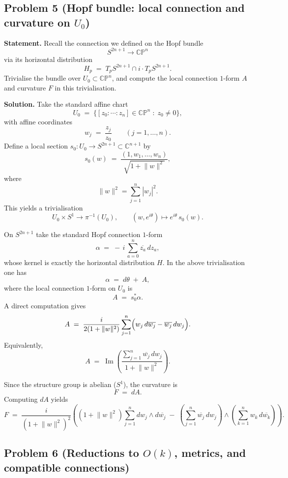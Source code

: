\documentclass[12pt,a4paper]{article}
\theoremstyle{plain}
\theoremstyle{definition}      %
\begin{document}
\subsection*{Problem 5 (Hopf bundle: local connection and curvature on $U_0$)}

\textbf{Statement.}
Recall the connection we defined on the Hopf bundle
\[
S^{2n+1}\longrightarrow \mathbb{CP}^n
\]
via its horizontal distribution
\[
H_p \;=\; T_pS^{2n+1}\cap i\cdot T_pS^{2n+1}.
\]
Trivialise the bundle over $U_0\subset \mathbb{CP}^n$, and compute the local connection $1$-form $A$ and curvature $F$ in this trivialisation.

\textbf{Solution.}
Take the standard affine chart
\[
U_0 \;=\;\{[z_0:\cdots:z_n]\in \mathbb{CP}^n \;:\; z_0\neq 0\},
\]
with affine coordinates
\[
w_j \;=\;\frac{z_j}{z_0}\qquad (j=1,\dots,n).
\]
Define a local section $s_0:U_0\to S^{2n+1}\subset \mathbb{C}^{n+1}$ by
\[
s_0(w)\;=\;\frac{(1,w_1,\dots,w_n)}{\sqrt{1+\lVert w\rVert^2}},
\]
where
\[
\lVert w\rVert^2=\sum_{j=1}^n |w_j|^2.
\]
This yields a trivialisation
\[
U_0\times S^1 \longrightarrow \pi^{-1}(U_0),
\qquad
(w,e^{i\theta})\longmapsto e^{i\theta}\,s_0(w).
\]

On $S^{2n+1}$ take the standard Hopf connection $1$-form
\[
\alpha \;=\; -\,i\,\sum_{a=0}^n \overline{z_a}\,dz_a,
\]
whose kernel is exactly the horizontal distribution $H$.
In the above trivialisation one has
\[
\alpha \;=\; d\theta \;+\; A,
\]
where the local connection $1$-form on $U_0$ is
\[
A \;=\; s_0^{*}\alpha.
\]
A direct computation gives
\[
A \;=\; \frac{i}{2(1+\lVert w\rVert^2)}\sum_{j=1}^n\Bigl(w_j\,d\overline{w_j}-\overline{w_j}\,dw_j\Bigr).
\]
Equivalently,
\[
A \;=\; \operatorname{Im}\!\left(\frac{\sum_{j=1}^n \overline{w_j}\,dw_j}{1+\lVert w\rVert^2}\right).
\]

Since the structure group is abelian ($S^1$), the curvature is
\[
F \;=\; dA.
\]
Computing $dA$ yields
\[
F
\;=\;
\frac{i}{(1+\lVert w\rVert^2)^2}
\left(
(1+\lVert w\rVert^2)\sum_{j=1}^n dw_j\wedge d\overline{w_j}
\;-\;
\left(\sum_{j=1}^n \overline{w_j}\,dw_j\right)\wedge
\left(\sum_{k=1}^n w_k\,d\overline{w_k}\right)
\right).
\]

\subsection*{Problem 6 (Reductions to $O(k)$, metrics, and compatible connections)}
\end{document}

